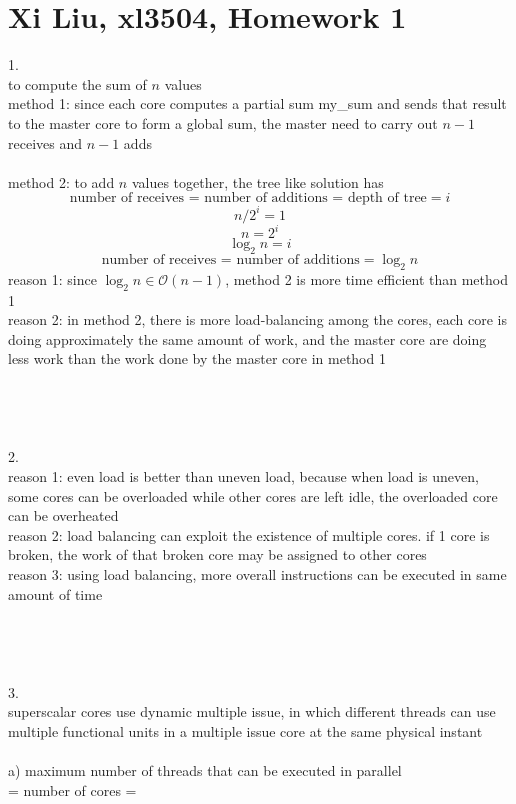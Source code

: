 \documentclass[12pt,border=4pt,multi]{article}%
\begin{document}
\section*{Xi Liu, xl3504, Homework 1}
1.\\
to compute the sum of $n$ values\\
method 1: since each core computes a partial sum my\_sum and sends that result to the master core to form a global sum, the master need to carry out $n - 1$ receives and $n - 1$ adds\\
\\
method 2: to add $n$ values together, the tree like solution has 
\[\text{number of receives = number of additions = depth of tree} = i\]
\[n / 2^i = 1\]
\[n = 2^i\]
\[\log_2 n = i\]
\[\text{number of receives = number of additions} = \log_2 n\]
reason 1: since $\log_2 n \in \mathcal{O}(n - 1)$, method 2 is more time efficient than method 1\\
reason 2: in method 2, there is more load-balancing among the cores, each core is doing approximately the same amount of work, and the master core are doing less work than the work done by the master core in method 1\\ 
\\
\\
\\
\\
2.\\
reason 1: even load is better than uneven load, because when load is uneven, some cores can be overloaded while other cores are left idle, the overloaded core can be overheated\\
reason 2: load balancing can exploit the existence of multiple cores. if 1 core is broken, the work of that broken core may be assigned to other cores\\
reason 3: using load balancing, more overall instructions can be executed in same amount of time\\
\\
\\
\\
\\
3.\\
superscalar cores use dynamic multiple issue, in which different threads can use multiple functional units in a multiple issue core at the same physical instant\\
\\
a) maximum number of threads that can be executed in parallel\\
= number of cores = \\
\end{document}
